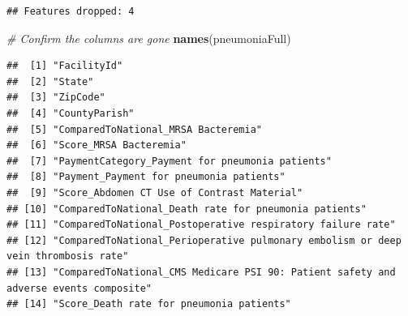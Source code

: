 \documentclass[
]{article}
\newenvironment{Shaded}{\begin{snugshade}}{\end{snugshade}}
\newcommand{\CommentTok}[1]{\textcolor[rgb]{0.56,0.35,0.01}{\textit{#1}}}
\newcommand{\FunctionTok}[1]{\textcolor[rgb]{0.13,0.29,0.53}{\textbf{#1}}}
\newcommand{\NormalTok}[1]{#1}
\begin{document}
\begin{verbatim}
## Features dropped: 4
\end{verbatim}

\begin{Shaded}
\begin{Highlighting}[]
\CommentTok{\# Confirm the columns are gone}
\FunctionTok{names}\NormalTok{(pneumoniaFull)}
\end{Highlighting}
\end{Shaded}

\begin{verbatim}
##  [1] "FacilityId"                                                                                                                               
##  [2] "State"                                                                                                                                    
##  [3] "ZipCode"                                                                                                                                  
##  [4] "CountyParish"                                                                                                                             
##  [5] "ComparedToNational_MRSA Bacteremia"                                                                                                       
##  [6] "Score_MRSA Bacteremia"                                                                                                                    
##  [7] "PaymentCategory_Payment for pneumonia patients"                                                                                           
##  [8] "Payment_Payment for pneumonia patients"                                                                                                   
##  [9] "Score_Abdomen CT Use of Contrast Material"                                                                                                
## [10] "ComparedToNational_Death rate for pneumonia patients"                                                                                     
## [11] "ComparedToNational_Postoperative respiratory failure rate"                                                                                
## [12] "ComparedToNational_Perioperative pulmonary embolism or deep vein thrombosis rate"                                                         
## [13] "ComparedToNational_CMS Medicare PSI 90: Patient safety and adverse events composite"                                                      
## [14] "Score_Death rate for pneumonia patients"                                                                                                  

\end{verbatim}
\end{document}
